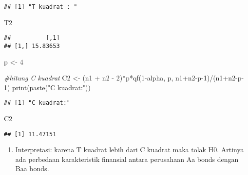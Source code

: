 \documentclass[
]{article}
\newenvironment{Shaded}{\begin{snugshade}}{\end{snugshade}}
\newcommand{\CommentTok}[1]{\textcolor[rgb]{0.56,0.35,0.01}{\textit{#1}}}
\newcommand{\DecValTok}[1]{\textcolor[rgb]{0.00,0.00,0.81}{#1}}
\newcommand{\FunctionTok}[1]{\textcolor[rgb]{0.00,0.00,0.00}{#1}}
\newcommand{\NormalTok}[1]{#1}
\newcommand{\OtherTok}[1]{\textcolor[rgb]{0.56,0.35,0.01}{#1}}
\newcommand{\SpecialCharTok}[1]{\textcolor[rgb]{0.00,0.00,0.00}{#1}}
\newcommand{\StringTok}[1]{\textcolor[rgb]{0.31,0.60,0.02}{#1}}
\providecommand{\tightlist}{%
  \setlength{\itemsep}{0pt}\setlength{\parskip}{0pt}}
\begin{document}
\begin{verbatim}
## [1] "T kuadrat : "
\end{verbatim}

\begin{Shaded}
\begin{Highlighting}[]
\NormalTok{T2}
\end{Highlighting}
\end{Shaded}

\begin{verbatim}
##          [,1]
## [1,] 15.83653
\end{verbatim}

\begin{Shaded}
\begin{Highlighting}[]
\NormalTok{p }\OtherTok{\textless{}{-}} \DecValTok{4}

\CommentTok{\#hitung C kuadrat}
\NormalTok{C2 }\OtherTok{\textless{}{-}}\NormalTok{ (n1 }\SpecialCharTok{+}\NormalTok{ n2 }\SpecialCharTok{{-}} \DecValTok{2}\NormalTok{)}\SpecialCharTok{*}\NormalTok{p}\SpecialCharTok{*}\FunctionTok{qf}\NormalTok{(}\DecValTok{1}\SpecialCharTok{{-}}\NormalTok{alpha, p, n1}\SpecialCharTok{+}\NormalTok{n2}\SpecialCharTok{{-}}\NormalTok{p}\DecValTok{{-}1}\NormalTok{)}\SpecialCharTok{/}\NormalTok{(n1}\SpecialCharTok{+}\NormalTok{n2}\SpecialCharTok{{-}}\NormalTok{p}\DecValTok{{-}1}\NormalTok{)}
\FunctionTok{print}\NormalTok{(}\FunctionTok{paste}\NormalTok{(}\StringTok{"C kuadrat:"}\NormalTok{))}
\end{Highlighting}
\end{Shaded}

\begin{verbatim}
## [1] "C kuadrat:"
\end{verbatim}

\begin{Shaded}
\begin{Highlighting}[]
\NormalTok{C2}
\end{Highlighting}
\end{Shaded}

\begin{verbatim}
## [1] 11.47151
\end{verbatim}

\begin{enumerate}
\def\labelenumi{\alph{enumi}.}
\setcounter{enumi}{1}
\tightlist
\item
  Interpretasi: karena T kuadrat lebih dari C kuadrat maka tolak H0.
  Artinya ada perbedaan karakteristik finansial antara perusahaan Aa
  bonds dengan Baa bonds.
\end{enumerate}
\end{document}
